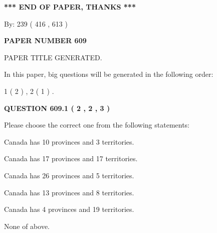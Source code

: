 \documentclass[12pt]{article}
\begin{document}
   
\vspace{1.0in} 
{\textbf{\large{ *** END OF PAPER, THANKS *** }}} 
   
   
\hspace{1.0in} By: 
 239 ( 416 ,  613 )
   
   
   
   
\newpage 
\setcounter{page}{ 
   609001 } 
   
   
   
   
 {\textbf{ \Large{ PAPER NUMBER  609  }}}
   
   
\vspace{0.2in}
   
   
   
   
   
   
   
   
 \vspace{0.2in}
 
 
 
 
   
   
 PAPER TITLE GENERATED.
   
   
   
\vspace{0.2in}
   
In this paper, big questions will be generated in the following order: 
   
   
   1 ( 2 )
 ,
   2 ( 1 )
 .
  
\vspace{0.2in}
  
{\textbf{\Large{QUESTION
609.1 
 ( 2 , 2 , 3 )
}}}
  
  
Please choose the correct one from the following statements:
 
 
Canada has 10  provinces and 3 territories.
 
 
Canada has  17 provinces and  17 territories.
 
 
Canada has  26 provinces and  5 territories.
 
 
Canada has  13 provinces and  8 territories.
 
 
Canada has   4 provinces and  19 territories.
 
 
 None of above.
 
 
\noindent{}
 
\end{document}
